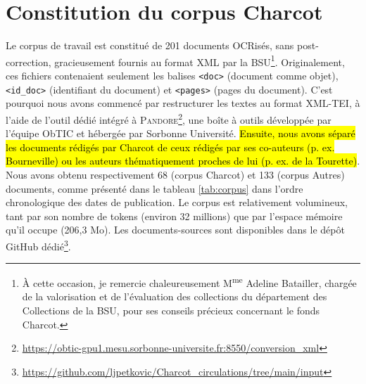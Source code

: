 \section{Constitution du corpus Charcot}
Le corpus de travail est constitué de 201 documents OCRisés, sans post-correction, gracieusement fournis au format \textsc{XML} par la \textsc{BSU}\footnote{À cette occasion, je remercie chaleureusement M\textsuperscript{me} Adeline Batailler, chargée de la valorisation et de l'évaluation des collections du département des Collections de la \textsc{BSU}, pour ses conseils précieux concernant le fonds Charcot.}. Originalement, ces fichiers contenaient seulement les balises \texttt{<doc>} (document comme objet), \texttt{<id\_doc>} (identifiant du document) et \texttt{<pages>} (pages du document). C'est pourquoi nous avons commencé par restructurer les textes au format \textsc{XML-TEI}, à l'aide de l’outil dédié intégré à \textsc{Pandore}\footnote{\url{https://obtic-gpu1.mesu.sorbonne-universite.fr:8550/conversion_xml}}, une boîte à outils développée par l'équipe ObTIC et hébergée par Sorbonne Université. 
\hl{Ensuite, nous avons séparé les documents rédigés par Charcot de ceux rédigés par ses co-auteurs (p. ex. Bourneville) ou les auteurs thématiquement proches de lui (p. ex. de la Tourette)}. Nous avons obtenu respectivement 68 (corpus \og{}Charcot\fg{}) et 133 (corpus \og{}Autres\fg{}) documents, comme présenté dans le tableau \ref{tab:corpus} dans l'ordre chronologique des dates de publication. Le corpus est relativement volumineux, tant par son nombre de tokens (environ 32 millions) que par l'espace mémoire qu'il occupe (206,3 Mo). Les documents-sources sont disponibles dans le dépôt GitHub dédié\footnote{\url{https://github.com/ljpetkovic/Charcot_circulations/tree/main/input}}.






\begingroup
\renewcommand{\arraystretch}{1.5}  %

